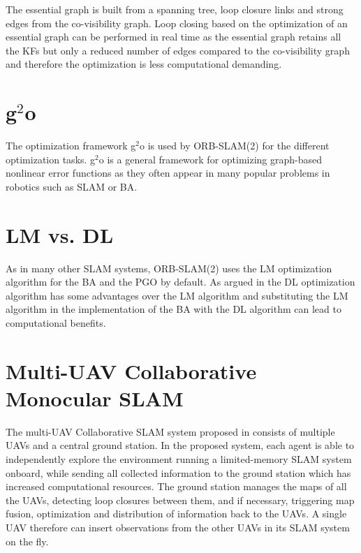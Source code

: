 The essential graph is built from a spanning tree, loop closure links and strong edges from the co-visibility graph. Loop closing based on the optimization of an essential graph can be performed in real time as the essential graph retains all the \acp{KF} but only a reduced number of edges compared to the co-visibility graph and therefore the optimization is less computational demanding.

\section{g$^2$o}
The optimization framework g$^2$o \cite{Kummerle2011} is used by ORB-SLAM(2) for the different optimization tasks. g$^2$o is a general framework for optimizing graph-based nonlinear error functions as they often appear in many popular problems in robotics such as \ac{SLAM} or \acf{BA}. 

\section{\acl{LM} vs. \acl{DL}}
As in many other \ac{SLAM} systems, ORB-SLAM(2) uses the \acl{LM} optimization algorithm for the \ac{BA} and the \acf{PGO} by default. As argued in \cite{Lourakis2005} the \acf{DL} optimization algorithm has some advantages over the \ac{LM} algorithm and substituting the \ac{LM} algorithm in the implementation of the \ac{BA} with the \ac{DL} algorithm can lead to computational benefits.

\section{Multi-UAV Collaborative Monocular SLAM}
The multi-\ac{UAV} Collaborative \ac{SLAM} system proposed in \cite{Schmuck2017} consists of multiple \acp{UAV} and a central ground station. In the proposed system, each agent is able to independently explore the environment running a limited-memory \ac{SLAM} system onboard, while sending all collected information to the ground station which has increased computational resources. The ground station manages the maps of all the \acp{UAV}, detecting loop closures between them, and if necessary, triggering map fusion, optimization and distribution of information back to the \acp{UAV}. A single \ac{UAV} therefore can insert observations from the other \acp{UAV} in its \ac{SLAM} system on the fly.
